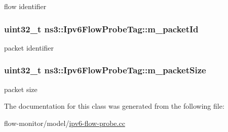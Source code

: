 flow identifier 

\subsubsection[{\texorpdfstring{m\+\_\+packet\+Id}{m_packetId}}]{\setlength{\rightskip}{0pt plus 5cm}uint32\+\_\+t ns3\+::\+Ipv6\+Flow\+Probe\+Tag\+::m\+\_\+packet\+Id\hspace{0.3cm}{\ttfamily [private]}}\hypertarget{classns3_1_1Ipv6FlowProbeTag_add2303a257d999c1f973ea07c17e58ad}{}\label{classns3_1_1Ipv6FlowProbeTag_add2303a257d999c1f973ea07c17e58ad}


packet identifier 

\subsubsection[{\texorpdfstring{m\+\_\+packet\+Size}{m_packetSize}}]{\setlength{\rightskip}{0pt plus 5cm}uint32\+\_\+t ns3\+::\+Ipv6\+Flow\+Probe\+Tag\+::m\+\_\+packet\+Size\hspace{0.3cm}{\ttfamily [private]}}\hypertarget{classns3_1_1Ipv6FlowProbeTag_ad7a05e0b3133454da69396acc7b7acbd}{}\label{classns3_1_1Ipv6FlowProbeTag_ad7a05e0b3133454da69396acc7b7acbd}


packet size 



The documentation for this class was generated from the following file\+:\begin{DoxyCompactItemize}
\item 
flow-\/monitor/model/\hyperlink{ipv6-flow-probe_8cc}{ipv6-\/flow-\/probe.\+cc}\end{DoxyCompactItemize}
